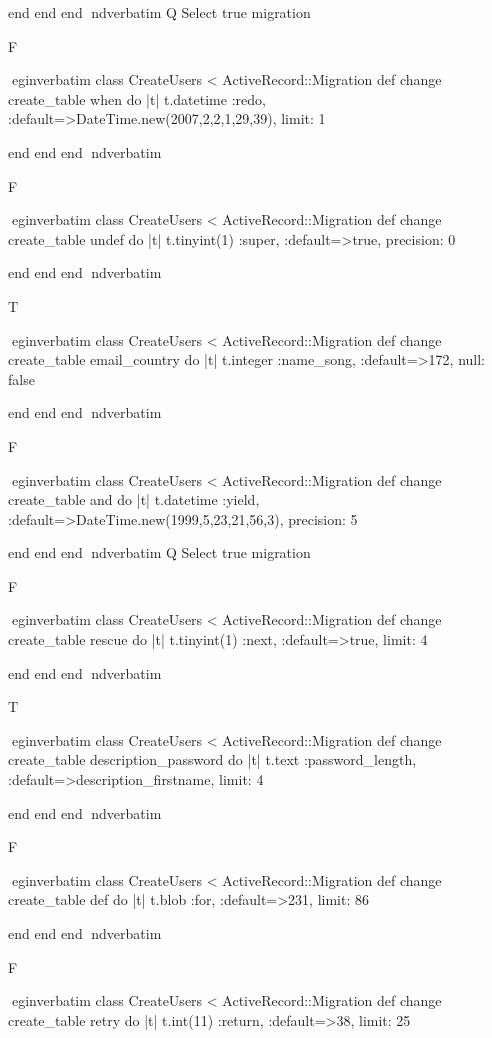     end 
  end 
end
nd{verbatim}
Q
 Select true migration

F

egin{verbatim}
 class CreateUsers < ActiveRecord::Migration 
  def change 
    create_table when do |t| 
      t.datetime :redo, :default=>DateTime.new(2007,2,2,1,29,39), limit: 1
    
    end 
  end 
end
nd{verbatim}

F

egin{verbatim}
 class CreateUsers < ActiveRecord::Migration 
  def change 
    create_table undef do |t| 
      t.tinyint(1) :super, :default=>true, precision: 0
    
    end 
  end 
end
nd{verbatim}

T

egin{verbatim}
 class CreateUsers < ActiveRecord::Migration 
  def change 
    create_table email_country do |t| 
      t.integer :name_song, :default=>172, null: false
    
    end 
  end 
end
nd{verbatim}

F

egin{verbatim}
 class CreateUsers < ActiveRecord::Migration 
  def change 
    create_table and do |t| 
      t.datetime :yield, :default=>DateTime.new(1999,5,23,21,56,3), precision: 5
    
    end 
  end 
end
nd{verbatim}
Q
 Select true migration

F

egin{verbatim}
 class CreateUsers < ActiveRecord::Migration 
  def change 
    create_table rescue do |t| 
      t.tinyint(1) :next, :default=>true, limit: 4
    
    end 
  end 
end
nd{verbatim}

T

egin{verbatim}
 class CreateUsers < ActiveRecord::Migration 
  def change 
    create_table description_password do |t| 
      t.text :password_length, :default=>description_firstname, limit: 4
    
    end 
  end 
end
nd{verbatim}

F

egin{verbatim}
 class CreateUsers < ActiveRecord::Migration 
  def change 
    create_table def do |t| 
      t.blob :for, :default=>231, limit: 86
    
    end 
  end 
end
nd{verbatim}

F

egin{verbatim}
 class CreateUsers < ActiveRecord::Migration 
  def change 
    create_table retry do |t| 
      t.int(11) :return, :default=>38, limit: 25
    
